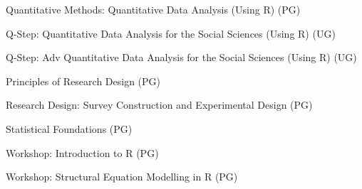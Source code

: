\documentclass[12pt]{article}
\begin{document}
\begin{innerlist}
        \item[] Quantitative Methods: Quantitative Data Analysis (Using R) (PG)
    	        	\begin{innerlist}
        		    	\item[] [SP09, SP10, SP11, SP12, SP13, SP14, AU17, AU18, AU19, AU20, AU21, AU22, AU23]
        		    \end{innerlist}
    	\item[] Q-Step: Quantitative Data Analysis for the Social Sciences (Using R) (UG)
    	        	\begin{innerlist}
        		    	\item[] [AU15, AU16, AU17, AU18, AU19, AU20]
        		    \end{innerlist}
        \item[] Q-Step: Adv Quantitative Data Analysis for the Social Sciences (Using R)  (UG)
    	        	\begin{innerlist}
        		    	\item[] [AU16 - 50\%]
        		    \end{innerlist}
        \item[] Principles of Research Design (PG)
        		    \begin{innerlist}
        		    	\item[] [AU09, AU13, SP19, SP20, SP21]
        		    \end{innerlist}
        \item[] Research Design: Survey Construction and Experimental Design (PG)
    	        	\begin{innerlist}
        		    	\item[] [SU10, AU11]
        		    \end{innerlist}

 		\item[] Statistical Foundations (PG)
    	        	\begin{innerlist}
        		    	\item[] [SP24, SP25]
        		    \end{innerlist}    
        

        \item[] Workshop: Introduction to R (PG)
    	        	\begin{innerlist}
        		    	\item[] [AU18, SP19, AU20]
        		    \end{innerlist}		
        \item[] Workshop: Structural Equation Modelling in R (PG)
    	        	\begin{innerlist}
        		    	\item[] [SP17, SP21]
        		    \end{innerlist}			
    \end{innerlist}
\end{document}
